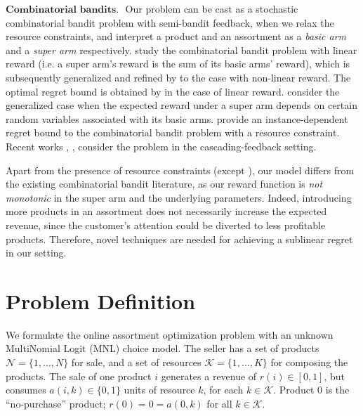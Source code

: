 \documentclass{article}
\theoremstyle{definition}
\newcommand{\KKK}{\mathcal{K}}
\newcommand{\NNN}{\mathcal{N}}
\begin{document}
$\textbf{Combinatorial bandits. }$ Our problem can be cast as a stochastic combinatorial bandit problem with semi-bandit feedback, when we relax the resource constraints, and interpret a product and an assortment as a \emph{basic arm} and a \emph{super arm} respectively. \cite{GaiKJ12} study the combinatorial bandit problem with linear reward (i.e. a super arm's reward is the sum of its basic arms' reward), which is subsequently generalized and refined by \cite{ChenWY13} to the case with non-linear reward. The optimal regret bound is obtained by \cite{KvetonWAS14} in the case of linear reward. \cite{ChenHLLLL16} consider the generalized case when the expected reward under a super arm depends on certain random variables associated with its basic arms. \cite{XiaQMYL16} provide an instance-dependent regret bound to the combinatorial bandit problem with a resource constraint. Recent works \cite{RadlinskiKJ08}, \cite{KvetonSWA15},  \cite{KvetonWAS15} consider the problem in the cascading-feedback setting.

Apart from the presence of resource constraints (except \cite{XiaQMYL16}), our model differs from the existing combinatorial bandit literature, as our reward function is \emph{not monotonic} in the super arm and the underlying parameters. Indeed, introducing more products in an assortment does not necessarily increase the expected revenue, since the customer's attention could be diverted to less profitable products. Therefore, novel techniques are needed for achieving a sublinear regret in our setting.



\section{Problem Definition}\label{sec:def}
We formulate the online assortment optimization problem with an unknown MultiNomial Logit (MNL) choice model. The seller has a set of products $\NNN = \{1, \ldots, N\}$ for sale, and a set of resources $\KKK = \{1, \ldots, K\}$ for composing the products. The sale of one product $i$ generates a revenue of $r(i)\in [0, 1]$, but consumes $a(i, k)\in \{0, 1\}$ units of resource $k$, for each $k\in \KKK$. Product 0 is the ``no-purchase'' product; $r(0) = 0 = a(0, k)$ for all $k\in \KKK$.
\end{document}
